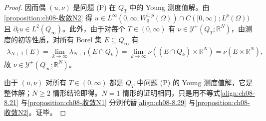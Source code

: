\documentclass[../../main.tex]{subfiles}%
\begin{document}
\begin{proof}
因而偶 $(u,\nu)$ 是问题 (P) 在 $Q_T$ 中的 Young 测度值解。由\cref{proposition:ch08-收敛N2} 得 $u\in L^\infty(0,\infty;W^{1,p}_0(\Omega))\cap C([0,\infty);L^p(\Omega))$ 且 $\partial_t u\in L^2(Q_\infty)$。此外，由于对每个 $T\in(0,\infty)$ 有 $\nu\in\mathcal{Y}^+(Q_T;\mathbb{R}^N)$，由测度的初等性质，对所有 Borel 集 $E\subseteq Q_\infty$ 有
\begin{align*}
\lambda_{N+1}(E)=\lim_{k\to\infty}\lambda_{N+1}(E\cap Q_k)=\lim_{k\to\infty}\nu((E\cap Q_k)\times\mathbb{R}^N)=\nu(E\times\mathbb{R}^N),
\end{align*}
故 $\nu\in\mathcal{Y}^+(Q_\infty;\mathbb{R}^N)$。

由于 $(u,\nu)$ 对所有 $T\in(0,\infty)$ 都是 $Q_T$ 中问题 (P) 的 Young 测度值解，它是整体解；$N\geqslant2$ 情形结论即得。$N=1$ 情形的证明相同，只是用不等式\eqref{align:ch08-8.21} 与\cref{proposition:ch08-收敛N1} 分别代替\eqref{align:ch08-8.29} 与\cref{proposition:ch08-收敛N2}。证毕。
\end{proof}
\end{document}
